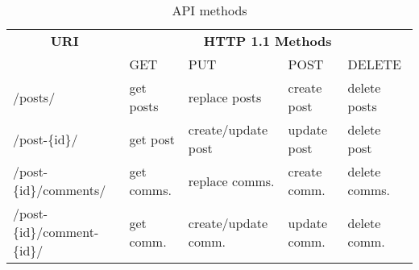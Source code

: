 \begin{table*}
    \begin{tabular}{*{5}l}
        \toprule
        \multicolumn{1}{c}{\textbf{URI}} & \multicolumn{4}{c}{\textbf{HTTP 1.1 Methods}} \\
        \cmidrule{2-5}
        & GET & PUT & POST & DELETE \\
        \midrule
        /posts/ & get posts & replace posts & create post & delete posts \\
        /post-\{id\}/ & get post & create/update post & update post & delete post \\
        /post-\{id\}/comments/ & get comms. & replace comms. & create comm. & delete comms. \\
        /post-\{id\}/comment-\{id\}/ & get comm. & create/update comm. & update comm. & delete comm. \\
        \bottomrule
    \end{tabular}
    \caption{API methods}
    \label{tab:api}
\end{table*}
